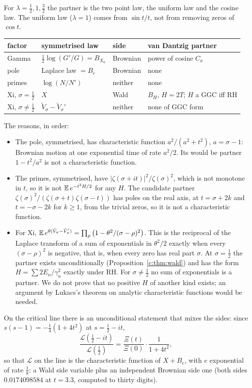 For $\lambda=\frac12,1,\frac32$ the partner is the two point law, the uniform law and the cosine law. The uniform law ($\lambda=1$) comes from $\sin t/t$, not from removing zeros of $\cos t$.
\begin{center}
\small
\begin{tabular}{p{}p{}p{}p{}}
\toprule
factor & symmetrised law & side & van Dantzig partner\\
\midrule
Gamma & $\frac12\log(G'/G)=B_{X_a}$ & Brownian & power of cosine $C_a$\\
pole & Laplace law $=B_e$ & Brownian & none\\
primes & $\log(N/N')$ & neither & none\\
Xi, $\sigma=\frac12$ & $X$ & Wald & $B_H$, $H=2T$; $H$ a GGC iff RH\\
Xi, $\sigma\ne\frac12$ & $\tilde V_\sigma-\tilde V_\sigma'$ & neither & none of GGC form\\
\bottomrule
\end{tabular}
\end{center}
The reasons, in order:
\begin{itemize}
\item The pole, symmetrised, has characteristic function $a^2/(a^2+t^2)$, $a=\sigma-1$: Brownian motion at one exponential time of rate $a^2/2$. Its would be partner $1-t^2/a^2$ is not a characteristic function.
\item The primes, symmetrised, have $|\zeta(\sigma+it)|^2/\zeta(\sigma)^2$, which is not monotone in $t$, so it is not $\mathbb{E}\,e^{-t^2H/2}$ for any $H$. The candidate partner $\zeta(\sigma)^2/(\zeta(\sigma+t)\zeta(\sigma-t))$ has poles on the real axis, at $t=\sigma+2k$ and $t=-\sigma-2k$ for $k\ge1$, from the trivial zeros, so it is not a characteristic function.
\item For Xi, $\mathbb{E}\,e^{\theta(\tilde V_\sigma-\tilde V_\sigma')}=\prod_\rho\big(1-\theta^2/(\sigma-\rho)^2\big)$. This is the reciprocal of the Laplace transform of a sum of exponentials in $\theta^2/2$ exactly when every $(\sigma-\rho)^2$ is negative, that is, when every zero has real part $\sigma$. At $\sigma=\frac12$ the partner exists unconditionally (Proposition~\ref{c:thm:wald}) and has the form $H=\sum2E_n/\gamma_n^2$ exactly under RH. For $\sigma\ne\frac12$ no sum of exponentials is a partner. We do not prove that no positive $H$ of another kind exists; an argument by Lukacs's theorem \cite{Lukacs68} on analytic characteristic functions would be needed.
\end{itemize}
On the critical line there is an unconditional statement that mixes the sides: since $s(s-1)=-\frac14(1+4t^2)$ at $s=\frac12-it$,
\[
\frac{\mathcal L(\frac12-it)}{\mathcal L(\frac12)}=\frac{\Xi(t)}{\Xi(0)}\cdot\frac1{1+4t^2},
\]
so that $\mathcal L$ on the line is the characteristic function of $X+B_e$,
with $e$ exponential of rate $\frac18$: a Wald side variable plus an independent Brownian side one (both sides $0.0174098584$ at $t=3.3$, computed to thirty digits).

